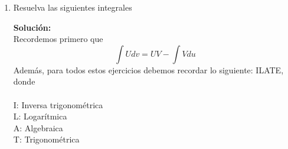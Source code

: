 \documentclass[12pt]{article}
\newenvironment{solucion}
{\begin{mdframed}[backgroundcolor=black!10]
		{\bf Solución:}\\
	}
	{
	\end{mdframed}
}
\newenvironment{preguntas}
{\begin{enumerate}\itemsep12pt
	}
	{
	\end{enumerate}
}
\newcommand{\ra}{\rightarrow}
\begin{document}
\begin{preguntas}
\begin{solucion}
\begin{enumerate}[a)]
\item $\displaystyle\int sec^4(x)tan^2(x)dx$\\\\
			En el caso de las secantes y tangentes, mientras el exponente de la secante y la tangente no sean impar y pan, respectivamente de manera simultanea, siempre podremos acuidar a pasar todo a tangente o todo a secante, de la siguiente forma
			$$\displaystyle\int sec^4(x)tan^2(x)dx
			=\displaystyle\int sec^2(x)tan^2(x)sec^2(x)dx$$
			$$=\displaystyle\int (1+tan^2(x))tan^2(x)sec^2(x)dx$$
			Luego,
			$$u = tan(x) \ra du = sec^2(x)dx$$
			Con lo que tenemos
			$$=\displaystyle\int (1+u^2)u^2du
			= \displaystyle\int (u^2+u^4)du
			= \dfrac{u^3}{3} + \dfrac{u^5}{5} + c$$
			Finalmente, volvemos a la variable original, con lo que
			$$\displaystyle\int sec^4(x)tan^2(x)dx = \dfrac{tan^3(x)}{3} + \dfrac{tan^5(x)}{5} + c$$
\item $\displaystyle\int sec^3(x)tan^3(x)dx$\\\\
			Como dije antes, también podemos convertir todo en secantes. Esto se hace de la siguiente forma
			$$\displaystyle\int sec^3(x)tan^3(x)dx
			= \displaystyle\int sec^2(x)tan^2(x)sec(x)tan(x)dx$$
			$$ = \displaystyle\int sec^2(x)(sec^2(x)-1)sec(x)tan(x)dx$$
			En este caso, hacemos el cambio
			$$u = sec(x) \ra du = sec(x)tan(x)$$
			Con lo que obtenemos
			$$ = \displaystyle\int u^2(u^2-1)du
			= \displaystyle\int (u^4-u^2)du
			= \dfrac{u^5}{5} - \dfrac{u^3}{3} + c$$
			Finalmente, volvemos a la variable original, con lo que
			$$= \dfrac{sec^5(x)}{5} - \dfrac{sec^3(x)}{3} + c$$	
\end{enumerate}
\end{solucion}
\item Resuelva las siguientes integrales
\begin{solucion}
Recordemos primero que
		$$\displaystyle\int Udv = UV - \displaystyle\int Vdu$$
		Además, para todos estos ejercicios debemos recordar lo siguiente: ILATE,
		donde\\\\
		I: Inversa trigonométrica\\
		L: Logarítmica\\
		A: Algebraica\\
		T: Trigonométrica\\

\end{solucion}
\end{preguntas}
\end{document}
